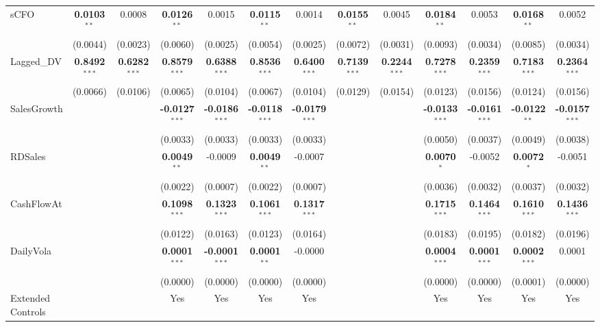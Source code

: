 \begin{landscape}
\begin{table}[H]
\begin{tabular}{lcccccccccccc}
sCFO & \textbf{0.0103}$^{**}$ & 0.0008 & \textbf{0.0126}$^{**}$ & 0.0015 & \textbf{0.0115}$^{**}$ & 0.0014 & \textbf{0.0155}$^{**}$ & 0.0045 & \textbf{0.0184}$^{**}$ & 0.0053 & \textbf{0.0168}$^{**}$ & 0.0052 \\
 & (0.0044) & (0.0023) & (0.0060) & (0.0025) & (0.0054) & (0.0025) & (0.0072) & (0.0031) & (0.0093) & (0.0034) & (0.0085) & (0.0034) \\
Lagged\_DV & \textbf{0.8492}$^{***}$ & \textbf{0.6282}$^{***}$ & \textbf{0.8579}$^{***}$ & \textbf{0.6388}$^{***}$ & \textbf{0.8536}$^{***}$ & \textbf{0.6400}$^{***}$ & \textbf{0.7139}$^{***}$ & \textbf{0.2244}$^{***}$ & \textbf{0.7278}$^{***}$ & \textbf{0.2359}$^{***}$ & \textbf{0.7183}$^{***}$ & \textbf{0.2364}$^{***}$ \\
 & (0.0066) & (0.0106) & (0.0065) & (0.0104) & (0.0067) & (0.0104) & (0.0129) & (0.0154) & (0.0123) & (0.0156) & (0.0124) & (0.0156) \\
SalesGrowth &  &  & \textbf{-0.0127}$^{***}$ & \textbf{-0.0186}$^{***}$ & \textbf{-0.0118}$^{***}$ & \textbf{-0.0179}$^{***}$ &  &  & \textbf{-0.0133}$^{***}$ & \textbf{-0.0161}$^{***}$ & \textbf{-0.0122}$^{**}$ & \textbf{-0.0157}$^{***}$ \\
 &  &  & (0.0033) & (0.0033) & (0.0033) & (0.0033) &  &  & (0.0050) & (0.0037) & (0.0049) & (0.0038) \\
RDSales &  &  & \textbf{0.0049}$^{**}$ & -0.0009 & \textbf{0.0049}$^{**}$ & -0.0007 &  &  & \textbf{0.0070}$^{*}$ & -0.0052 & \textbf{0.0072}$^{*}$ & -0.0051 \\
 &  &  & (0.0022) & (0.0007) & (0.0022) & (0.0007) &  &  & (0.0036) & (0.0032) & (0.0037) & (0.0032) \\
CashFlowAt &  &  & \textbf{0.1098}$^{***}$ & \textbf{0.1323}$^{***}$ & \textbf{0.1061}$^{***}$ & \textbf{0.1317}$^{***}$ &  &  & \textbf{0.1715}$^{***}$ & \textbf{0.1464}$^{***}$ & \textbf{0.1610}$^{***}$ & \textbf{0.1436}$^{***}$ \\
 &  &  & (0.0122) & (0.0163) & (0.0123) & (0.0164) &  &  & (0.0183) & (0.0195) & (0.0182) & (0.0196) \\
DailyVola &  &  & \textbf{0.0001}$^{***}$ & \textbf{-0.0001}$^{***}$ & \textbf{0.0001}$^{**}$ & -0.0000 &  &  & \textbf{0.0004}$^{***}$ & \textbf{0.0001}$^{***}$ & \textbf{0.0002}$^{***}$ & 0.0001 \\
 &  &  & (0.0000) & (0.0000) & (0.0000) & (0.0000) &  &  & (0.0000) & (0.0000) & (0.0001) & (0.0000) \\
\midrule
Extended Controls &  &  & Yes & Yes & Yes & Yes &  &  & Yes & Yes & Yes & Yes \\

\end{tabular}
\end{table}
\end{landscape}
